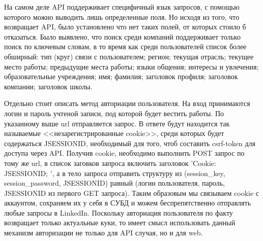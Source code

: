 На самом деле API поддерживает специфичный язык запросов, с помощью которого можно выводить лишь определенные поля. Но исходя из
того, что возвращает API, было установлено что нет таких полей, от которых стоило б отказаться.
Было выявлено, что поиск среди компаний поддерживает только поиск по ключевым словам, в то время как среди пользователей список 
более обширный: тип (круг) связи с пользователем; регион; текущая отрасль; текущее место работы; предыдущие места работы;
языки общения; интересы и увлечения; образовательные учреждения; имя; фамилия; заголовок профиля; заголовок компании; заголовок школы.

Отдельно стоит описать метод авториации пользователя. На вход принимаются логин и пароль учтеной записи, под которой будет вестить работы.
По указанному выше url отправляется запрос. В ответе будут находится так называемые <<незарегистрированные cookie>>, среди которых 
будет содержаться JSESSIONID, необходимый для того, чтоб составить csrf-token для доступа через API. Получив cookie, необходимо
выполнить POST запрос по тому же url, в список заговков запроса включить заголовок 'Cookie: JSESSIONID; ', а в тело запроса 
отправить структуру из (session\_key, session\_password, JSESSIONID) равный (логин пользователя, пароль, JSESSIONID из первого
GET запроса). Таким образовым мы связываем cookie с аккаунтом, сохраняем их у себя в СУБД и можем беспрепятственно отправлять любые
запросы в LinkedIn. Поскольку авториация пользователя по факту возвращает только актуальные куки, то имеет смысл использовать 
данный механизм авторизации не только для API случая, но и для web.
